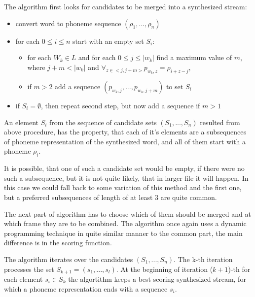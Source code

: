 \documentclass[12pt,a4paper,english]{article}
\begin{document}
The algorithm first looks for candidates to be merged into a synthesized stream:
\begin{itemize}
    \item convert word to phoneme sequence $(\rho_1, ..., \rho_n)$
    \item for each $0 \leq i \leq n$ start with an empty set $S_i$:
    \begin{itemize}
        \item for each $W_k \in L$ and for each $0 \leq j \leq |w_k|$ find a maximum value of $m$, \newline
              where $j+m < |w_k|$ and $\forall_{z \in <j, j+m>} p_{w_k, z} = \rho_{i+z-j}$,
        \item if $m > 2$ add a sequence $(p_{w_k, j}, ..., p_{w_k, j + m})$ to set $S_i$
    \end{itemize}
    \item if $S_i=\emptyset$, then repeat second step, but now add a sequence if $m>1$
\end{itemize}

An element $S_i$ from the sequence of candidate sets $(S_1,...,S_n)$ resulted from above procedure, has the property, that each of it's elements are a subsequences of phoneme representation of the synthesized word, and all of them start with a phoneme $\rho_i$. \newline

It is possible, that one of such a candidate set would be empty, if there were no such a subsequence, but it is not quite likely, that in larger file it will happen. In this case we could fall back to some variation of this method and the first one, but a preferred subsequences of length of at least 3 are quite common.\newline

The next part of algorithm has to choose which of them should be merged and at which frame they are to be combined. \newline
The algorithm once again uses a dynamic programming technique in quite similar manner to the common part, the main difference is in the scoring function.

\newpage

The algorithm iterates over the candidates $(S_1, ..., S_n)$. \newline
The k-th iteration processes the set $S_{k+1} = (s_1, ..., s_l)$. \newline
At the beginning of iteration ($k+1$)-th for each element $s_i \in S_k$ the algortithm keeps a best scoring synthesized stream, for which a phoneme representation ends with a sequence $s_i$. \newline
\end{document}
